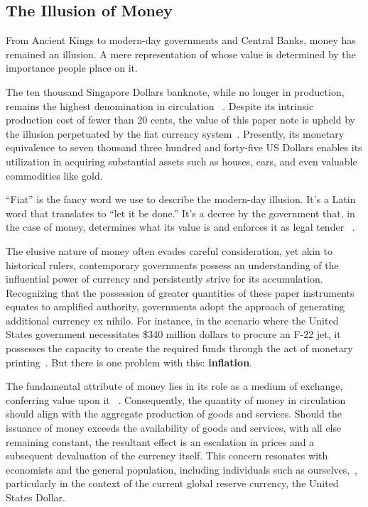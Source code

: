 \subsection{The Illusion of Money}
From Ancient Kings to modern-day governments and Central Banks, money has remained an illusion. A mere representation of
whose value is determined by the importance people place on it.

The ten thousand Singapore Dollars banknote, while no longer in production, remains the highest denomination in circulation
~\cite{goodhart1998}. Despite its intrinsic production cost of fewer than 20 cents, the value of this paper note is upheld
by the illusion perpetuated by the fiat currency system~\cite{gupta2019}. Presently, its monetary equivalence to seven
thousand three hundred and forty-five US Dollars enables its utilization in acquiring substantial assets such as houses,
cars, and even valuable commodities like gold.

“Fiat” is the fancy word we use to describe the modern-day illusion. It's a Latin word that translates to “let it be done.”
It's a decree by the government that, in the case of money, determines what its value is and enforces it as legal tender
~\cite{reinhart2018, friedman2000}.

The elusive nature of money often evades careful consideration, yet akin to historical rulers, contemporary governments
possess an understanding of the influential power of currency and persistently strive for its accumulation. Recognizing
that the possession of greater quantities of these paper instruments equates to amplified authority, governments adopt the
approach of generating additional currency ex nihilo. For instance, in the scenario where the United States government
necessitates \$340 million dollars to procure an F-22 jet, it possesses the capacity to create the required funds through
the act of monetary printing~\cite{graeber2011, mankiw2014}. But there is one problem with this: \textbf{inflation}.

The fundamental attribute of money lies in its role as a medium of exchange, conferring value upon it ~\cite{mankiw2014}.
Consequently, the quantity of money in circulation should align with the aggregate production of goods and services. Should
the issuance of money exceeds the availability of goods and services, with all else remaining constant, the resultant effect
is an escalation in prices and a subsequent devaluation of the currency itself. This concern resonates with economists and
the general population, including individuals such as ourselves,~\cite{blinder2010}, particularly in the context of the
current global reserve currency, the United States Dollar.


